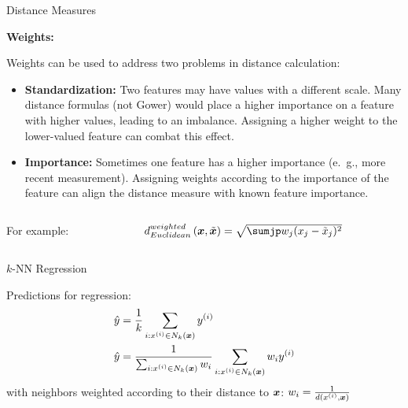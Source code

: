 \documentclass[11pt,compress,t,notes=noshow, xcolor=table]{beamer}
\begin{document}
\begin{vbframe}{Distance Measures}
\vfill

\framebreak

\textbf{Weights:}
\vfill

Weights can be used to address two problems in distance calculation:

\begin{itemize}
  \item \textbf{Standardization:} Two features may have values with a different scale. Many distance formulas (not Gower) would place a higher importance on a feature with higher values, leading to an imbalance. Assigning a higher weight to the lower-valued feature can combat this effect.
  \item \textbf{Importance:} Sometimes one feature has a higher importance (e.~g., more recent measurement). Assigning weights according to the importance of the feature can align the distance measure with known feature importance.
\end{itemize}

\begin{columns}[T]
  \begin{column}{0.2\textwidth}
    For example:
  \end{column}
  \begin{column}{0.8\textwidth}
     $d^{weighted}_{Euclidean}\left(\xv, \tilde{\xv}\right) = \sqrt{\sumjp w_{j}(x_j- \tilde{x}_j)^2}$
  \end{column}
\end{columns}

\vfill

\end{vbframe}

\begin{frame}{$k$-NN Regression}

Predictions for regression:
\begin{align*}
\hat{y} &= \frac{1}{k} \sum_{i: x^{(i)} \in N_k(\bm{x})} y^{(i)}\\
\hat{y} &= \frac{1}{\sum_{i: x^{(i)} \in N_k(\bm{x})} w_i} \sum_{i: x^{(i)} \in N_k(\bm{x})} w_i y^{(i)}
\end{align*}
with neighbors weighted according to their distance to $\bm{x}$: $w_i = \frac{1}{d(x^{(i)}, \bm{x})}$

\end{frame}
\end{document}

